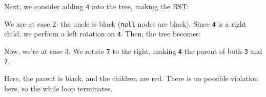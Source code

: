 \documentclass[a4paper, openany]{memoir}
\begin{document}
\noindent Next, we consider adding \texttt{4} into the tree, making the BST:
\begin{center}
\end{center}
We are at case 2- the uncle is black (\texttt{null} nodes are black). Since \texttt{4} is a right child, we perform a left rotation on \texttt{4}. Then, the tree becomes:
\begin{center}
\end{center}
Now, we're at case 3. We rotate \texttt{7} to the right, making \texttt{4} the parent of both \texttt{3} and \texttt{7}.
\begin{center}
\end{center}
Here, the parent is black, and the children are red. There is no possible violation here, so the while loop terminates.
\end{document}
